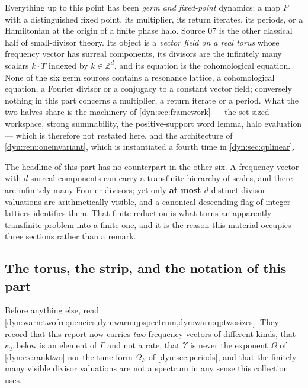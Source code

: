 \documentclass[11pt,letterpaper]{article}
\theoremstyle{definition}
\theoremstyle{remark}
\newcommand{\Z}{\mathbb Z}
\newcommand{\kups}{\kappa_{\Upsilon}}
\numberwithin{equation}{section}
\begin{document}
Everything up to this point has been \emph{germ and fixed-point} dynamics:
a map $F$ with a distinguished fixed point, its multiplier, its return
iterates, its periods, or a Hamiltonian at the origin of a finite phase
halo. Source 07 is the other classical half of small-divisor theory. Its
object is a \emph{vector field on a real torus} whose frequency vector has
surreal components, its divisors are the infinitely many scalars
$k\cdot\Upsilon$ indexed by $k\in\Z^{d}$, and its equation is the
cohomological equation. None of the six germ sources contains a resonance
lattice, a cohomological equation, a Fourier divisor or a conjugacy to a
constant vector field; conversely nothing in this part concerns a
multiplier, a return iterate or a period. What the two halves share is the
machinery of \cref{dyn:sec:framework} --- the set-sized workspace, strong
summability, the positive-support word lemma, halo evaluation --- which is
therefore not restated here, and the architecture of
\cref{dyn:rem:oneinvariant}, which is instantiated a fourth time in
\cref{dyn:sec:qplinear}.

The headline of this part has no counterpart in the other six. A frequency
vector with $d$ surreal components can carry a transfinite hierarchy of
scales, and there are infinitely many Fourier divisors; yet only
\textbf{at most $d$} distinct divisor valuations are arithmetically
visible, and a canonical descending flag of integer lattices identifies
them. That finite reduction is what turns an apparently transfinite problem
into a finite one, and it is the reason this material occupies three
sections rather than a remark.

\subsection{The torus, the strip, and the notation of this part}
\label{dyn:subsec:qpnotation}

Before anything else, read
\cref{dyn:warn:twofrequencies,dyn:warn:qpspectrum,dyn:warn:qptwosizes}.
They record that this report now carries \emph{two} frequency vectors of
different kinds, that $\kups$ below is an element of $\Gamma$ and not a
rate, that $\Upsilon$ is never the exponent $\Omega$ of
\cref{dyn:ex:ranktwo} nor the time form $\Omega_F$ of
\cref{dyn:sec:periods}, and that the finitely many visible divisor
valuations are not a spectrum in any sense this collection uses.
\end{document}
